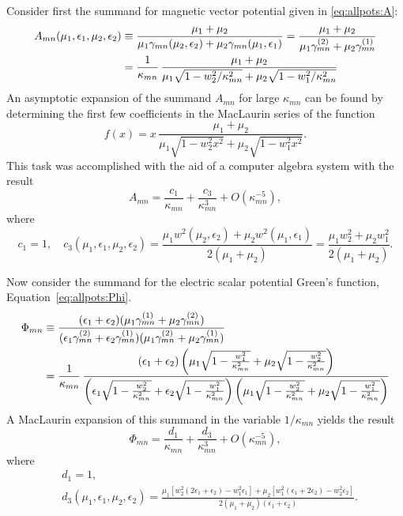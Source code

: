 Consider first the summand for  magnetic vector potential given in
\eqref{eq:allpots:A}:
\begin{align}
  A_{mn}(\mu_1,\epsilon_1,\mu_2,\epsilon_2) &\equiv   
  \frac{\mu_1 + \mu_2}%
  {\mu_1\gamma_{mn}(\mu_2,\epsilon_2) +
    \mu_2\gamma_{mn}(\mu_1,\epsilon_1)} 
  =
  \frac{\mu_1 + \mu_2}%
  {\mu_1\gamma\two_{mn}+\mu_2\gamma\one_{mn}} \nonumber \\
  &= \frac{1}{\kappa_{mn}} \,
  \frac{\mu_1 + \mu_2}%
  {\mu_1 \sqrt{1-w_2^2/\kappa_{mn}^2} +
    \mu_2 \sqrt{1-w_1^2/\kappa_{mn}^2}} \nonumber \\
\end{align}
An asymptotic expansion of the summand $A_{mn}$ for large
$\kappa_{mn}$ can be found by determining the first few coefficients
in the MacLaurin series of the function
\begin{equation}
  \label{eq:AMac}
  f(x) = x \,
  \frac{\mu_1 + \mu_2}%
  {\mu_1 \sqrt{1-w_2^2 x^2} +
    \mu_2 \sqrt{1-w_1^2 x^2}}.
\end{equation}
This task was accomplished with the aid of a computer algebra
system with the result
\begin{equation}
  \label{eq:Aasymp}
  A_{mn} = \frac{c_1}{\kappa_{mn}} + 
  \frac{c_3}{\kappa_{mn}^{3}} + O(\kappa_{mn}^{-5}),
\end{equation}
where
\begin{equation}
  \label{eq:cdef}
  c_1 = 1, \quad c_3(\mu_1,\epsilon_1,\mu_2,\epsilon_2) 
  = \frac{\mu_1 w^2(\mu_2,\epsilon_2) + \mu_2 w^2(\mu_1,\epsilon_1)}{2(\mu_1 + \mu_2)}
  =\frac{\mu_1 w_2^2 + \mu_2 w_1^2}{2(\mu_1 + \mu_2)}.
\end{equation}

Now consider the summand for the electric scalar potential Green's
function, Equation~\eqref{eq:allpots:Phi}.
  \newcommand{\fac}[1]{\sqrt{1-\frac{w_{#1}^2}{\kappa_{mn}^2}}}
\begin{align}
  \Phi_{mn} &\equiv 
  \frac{(\epsilon_1+\epsilon_2)
    (\mu_1\gamma\one_{mn} + \mu_2\gamma\two_{mn})}%
  {(\epsilon_1\gamma\two_{mn}+\epsilon_2\gamma\one_{mn})
    (\mu_1\gamma\two_{mn}+\mu_2\gamma\one_{mn}) }  \nonumber \\
  &= 
  \frac{1}{\kappa_{mn}} \,
  \frac{(\epsilon_1+\epsilon_2)\left(\mu_1\fac1 + \mu_2\fac2\right)}%
  {\left(\epsilon_1\fac2 + \epsilon_2\fac1\right) \left(\mu_1\fac2+\mu_2\fac1\right) }
\end{align}
A MacLaurin expansion of this summand in the variable $1/\kappa_{mn}$
yields the result
\begin{equation}
  \label{eq:Phiasymp}
  \Phi_{mn} = \frac{d_1}{\kappa_{mn}} + 
  \frac{d_3}{\kappa_{mn}^{3}} + O(\kappa_{mn}^{-5}),
\end{equation}
where
\begin{subequations}
  \label{eq:ddef}
  \begin{align}
    &d_1 = 1, \\
    &d_3(\mu_1,\epsilon_1,\mu_2,\epsilon_2) = 
    \frac{\mu_1[w_2^2(2\epsilon_1+\epsilon_2)-w_1^2\epsilon_1] 
      + \mu_2[w_1^2(\epsilon_1+2\epsilon_2)-w_2^2\epsilon_2]}%
    {2(\mu_1+\mu_2)(\epsilon_1+\epsilon_2)}.
  \end{align}
\end{subequations}


